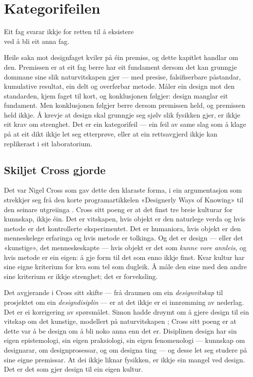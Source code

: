 \chapter{Kategorifeilen}

\begin{motto}
Eit fag svarar ikkje for retten til å eksistere\\ ved å bli eit anna fag.
\end{motto}

Heile saka mot designfaget kviler på éin premiss, og dette kapitlet handlar om den. Premissen er at eit fag berre har eit fundament dersom det kan grunngje dommane sine slik naturvitskapen gjer — med presise, falsifiserbare påstandar, kumulative resultat, ein delt og overførbar metode. Måler ein design mot den standarden, kjem faget til kort, og konklusjonen følgjer: design manglar eit fundament. Men konklusjonen følgjer berre dersom premissen held, og premissen held ikkje. Å krevje at design skal grunngje seg sjølv slik fysikken gjer, er ikkje eit krav om strenghet. Det er ein kategorifeil — ein feil av same slag som å klage på at eit dikt ikkje let seg etterprøve, eller at ein rettsavgjerd ikkje kan replikerast i eit laboratorium.

\section{Skiljet Cross gjorde}

Det var Nigel Cross som gav dette den klaraste forma, i ein argumentasjon som strekkjer seg frå den korte programartikkelen «Designerly Ways of Knowing» \autocite{cross1982} til den seinare utgreiinga \autocite{cross2006}. Cross sitt poeng er at det finst tre breie kulturar for kunnskap, ikkje éin. Det er vitskapen, hvis objekt er den naturlege verda og hvis metode er det kontrollerte eksperimentet. Det er humaniora, hvis objekt er den menneskelege erfaringa og hvis metode er tolkinga. Og det er design — eller det «kunstige», det menneskeskapte — hvis objekt er det som \emph{kunne vore annleis}, og hvis metode er ein eigen: å gje form til det som enno ikkje finst. Kvar kultur har sine eigne kriterium for kva som tel som dugleik. Å måle den eine med den andre sine kriterium er ikkje strenghet; det er forveksling.

Det avgjerande i Cross sitt skifte — frå draumen om ein \emph{designvitskap} til prosjektet om ein \emph{designdisiplin} — er at det ikkje er ei innrømming av nederlag. Det er ei korrigering av spørsmålet. Simon hadde drøymt om å gjere design til ein vitskap om det kunstige, modellert på naturvitskapen \autocite{simon1969sciences}; Cross sitt poeng er at dette var å be design om å bli noko anna enn det er. Disiplinen design har sin eigen epistemologi, sin eigen praksiologi, sin eigen fenomenologi — kunnskap om designarar, om designprosessar, og om designa ting — og desse let seg studere på sine eigne premissar. At dei ikkje liknar fysikken, er ikkje ein mangel ved design. Det er det som gjer design til ein eigen kultur.

